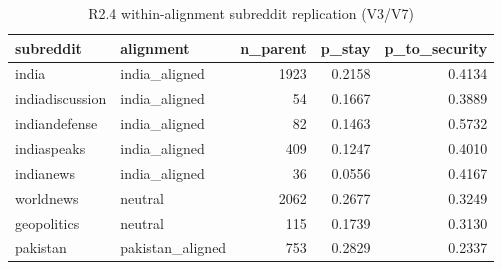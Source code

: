 \begin{table}
\caption{R2.4 within-alignment subreddit replication (V3/V7)}
\label{tab:r1r2_subreddit_refit}
\begin{tabular}{llrrr}
\toprule
subreddit & alignment & n\_parent & p\_stay & p\_to\_security \\
\midrule
india & india\_aligned & 1923 & 0.2158 & 0.4134 \\
indiadiscussion & india\_aligned & 54 & 0.1667 & 0.3889 \\
indiandefense & india\_aligned & 82 & 0.1463 & 0.5732 \\
indiaspeaks & india\_aligned & 409 & 0.1247 & 0.4010 \\
indianews & india\_aligned & 36 & 0.0556 & 0.4167 \\
worldnews & neutral & 2062 & 0.2677 & 0.3249 \\
geopolitics & neutral & 115 & 0.1739 & 0.3130 \\
pakistan & pakistan\_aligned & 753 & 0.2829 & 0.2337 \\
\bottomrule
\end{tabular}
\end{table}

